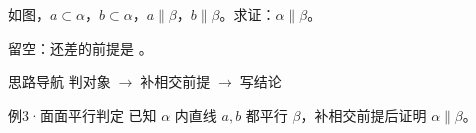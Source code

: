 \documentclass{exam-zh}
\begin{document}
\begin{eduProblemBlock}[例3·面面平行判定]
\noindent
\begin{minipage}[t]{\dimexpr\linewidth-70mm-6mm\relax}
\vspace{0pt}
如图，$a\subset\alpha$，$b\subset\alpha$，$a\parallel\beta$，$b\parallel\beta$。求证：$\alpha\parallel\beta$。
\par\noindent 留空：还差的前提是 \underline{\hspace{20mm}}。

\end{minipage}\hfill
\begin{diagramcoltikz}{70mm}{平面 α 内有直线 a、b，都平行于平面 β。}
}
\end{diagramcoltikz}
\end{eduProblemBlock}





\begin{eduAuxItem}{思路导航}
判对象$\;\to\;$补相交前提$\;\to\;$写结论\end{eduAuxItem}




\begin{eduSubQuestionItem}{例3·面面平行判定}
已知 $\alpha$ 内直线 $a,b$ 都平行 $\beta$，补相交前提后证明 $\alpha\parallel\beta$。\end{eduSubQuestionItem}

\begin{eduDualExplain}
  \begin{eduExplainLeft}
  \end{eduExplainLeft}

  \begin{eduExplainRight}
  \end{eduExplainRight}
\end{eduDualExplain}
\end{document}
